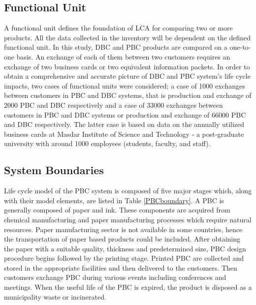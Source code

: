 \documentclass[3p,times,procedia]{elsarticle}
\begin{document}
\subsection{Functional Unit}\label{sec:FunctionalUnit}

A functional unit defines the foundation of LCA for comparing two or more products. All the data collected in the inventory will be dependent on the defined functional unit. In this study, DBC and PBC products are compared on a one-to-one basis. An exchange of each of them between two customers requires an exchange of two business cards or two equivalent information packets. In order to obtain a comprehensive and accurate picture of DBC and PBC system's life cycle impacts, two cases of functional units were considered; a case of 1000 exchanges between customers in PBC and DBC systems, that is production and exchange of 2000 PBC and DBC respectively and a case of 33000 exchanges between customers in PBC and DBC systems or production and exchange of 66000 PBC and DBC respectively. The latter case is based on data on the annually utilized business cards at Masdar Institute of Science and Technology - a post-graduate university with around 1000 employees (students, faculty, and staff).

\subsection{System Boundaries} \label{PBCBoundary}
Life cycle model of the PBC system is composed of five major stages which, along with their model elements, are listed in Table \ref{PBCboundary}. A PBC is generally composed of paper and ink. These components are acquired from chemical manufacturing and paper manufacturing processes which require natural resources. Paper manufacturing sector is not available in some countries, hence the transportation of paper based products could be included. After obtaining the paper with a suitable quality, thickness and predetermined size, PBC design procedure begins followed by the printing stage. Printed PBC are collected and stored in the appropriate facilities and then delivered to the customers. Then customers exchange PBC during various events including conferences and meetings. When the useful life of the PBC is expired, the product is disposed as a municipality waste or incinerated.
\end{document}
